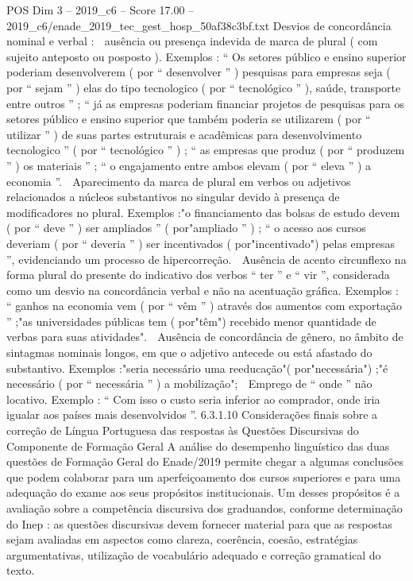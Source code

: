 \begin{textsample}{POS Dim 3 – 2019\_c6 – Score 17.00 – 2019\_c6/enade\_2019\_tec\_gest\_hosp\_50af38c3bf.txt}
Desvios de concordância nominal e verbal :  ausência ou presença indevida de marca de plural ( com sujeito anteposto ou posposto ).
Exemplos : “ Os setores público e ensino superior poderiam desenvolverem ( por “ desenvolver ” ) pesquisas para empresas seja ( por “ sejam ” ) elas do tipo tecnologico ( por “ tecnológico ” ), saúde, transporte entre outros ” ; “ já as empresas poderiam financiar projetos de pesquisas para os setores público e ensino superior que também poderia se utilizarem ( por “ utilizar ” ) de suas partes estruturais e acadêmicas para desenvolvimento tecnologico ” ( por “ tecnológico ” ) ; “ as empresas que produz ( por “ produzem ” ) os materiais ” ; “ o engajamento entre ambos elevam ( por “ eleva ” ) a economia ”.  Aparecimento da marca de plural em verbos ou adjetivos relacionados a núcleos substantivos no singular devido à presença de modificadores no plural.
Exemplos :"o financiamento das bolsas de estudo devem ( por “ deve ” ) ser ampliados ” ( por"ampliado ” ) ; “ o acesso aos cursos deveriam ( por “ deveria ” ) ser incentivados ( por"incentivado") pelas empresas ”, evidenciando um processo de hipercorreção.  Ausência de acento circunflexo na forma plural do presente do indicativo dos verbos “ ter ” e “ vir ”, considerada como um desvio na concordância verbal e não na acentuação gráfica.
Exemplos : “ ganhos na economia vem ( por “ vêm ” ) através dos aumentos com exportação ” ;"as universidades públicas tem ( por"têm") recebido menor quantidade de verbas para suas atividades".  Ausência de concordância de gênero, no âmbito de sintagmas nominais longos, em que o adjetivo antecede ou está afastado do substantivo.
Exemplos :"seria necessário uma reeducação"( por"necessária") ;"é necessário ( por “ necessária ” ) a mobilização";  Emprego de “ onde ” não locativo.
Exemplo : “ Com isso o custo seria inferior ao comprador, onde iria igualar aos países mais desenvolvidos ”. 6.3.1.10 Considerações finais sobre a correção de Língua Portuguesa das respostas às Questões Discursivas do Componente de Formação Geral A análise do desempenho linguístico das duas questões de Formação Geral do Enade/2019 permite chegar a algumas conclusões que podem colaborar para um aperfeiçoamento dos cursos superiores e para uma adequação do exame aos seus propósitos institucionais.
Um desses propósitos é a avaliação sobre a competência discursiva dos graduandos, conforme determinação do Inep : as questões discursivas devem fornecer material para que as respostas sejam avaliadas em aspectos como clareza, coerência, coesão, estratégias argumentativas, utilização de vocabulário adequado e correção gramatical do texto.

\end{textsample}
